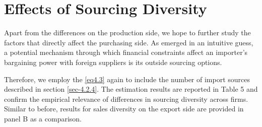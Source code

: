 \section{Effects of Sourcing Diversity}

Apart from the differences on the production side, we hope to further study the factors that directly affect the purchasing side. As emerged in an intuitive guess, a potential mechanism through which financial constraints affect an importer's bargaining power with foreign suppliers is its outside sourcing options. 

Therefore, we employ the \ref{eq4.3} again to include the number of import sources described in section \ref{sec-4.2.4}. The estimation results are reported in Table 5 and confirm the empirical relevance of differences in sourcing diversity across firms. Similar to before, results for sales diversity on the export side are provided in panel B as a comparison.

